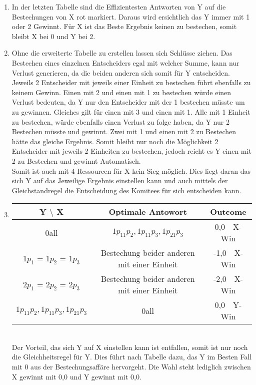 \documentclass[a4paper, 11pt]{article}
\begin{document}
\begin{enumerate}
	\item In der letzten Tabelle sind die Effizientesten Antworten von Y auf die Bestechungen von X rot markiert. Daraus wird ersichtlich das Y immer mit 1 oder 2 Gewinnt. Für X ist das Beste Ergebnis keinen zu bestechen, somit bleibt X bei 0 und Y bei 2.
	\item Ohne die erweiterte Tabelle zu erstellen lassen sich Schlüsse ziehen. Das Bestechen eines einzelnen Entscheiders egal mit welcher Summe, kann nur Verlust generieren, da die beiden anderen sich somit für Y entscheiden. Jeweils 2 Entscheider mit jeweils einer Einheit zu bestechen führt ebenfalls zu keinem Gewinn. Einen mit 2 und einen mit 1 zu bestechen würde einen Verlust bedeuten, da Y nur den Entscheider mit der 1 bestechen müsste um zu gewinnen. Gleiches gilt für einen mit 3 und einen mit 1. Alle mit 1 Einheit zu bestechen, würde ebenfalls einen Verlust zu folge haben, da Y nur 2 Bestechen müsste und gewinnt. Zwei mit 1 und einen mit 2 zu Bestechen hätte das gleiche Ergebnis. Somit bleibt nur noch die Möglichkeit 2 Entscheider mit jeweils 2 Einheiten zu bestechen, jedoch reicht es Y einen mit 2 zu Bestechen und gewinnt Automatisch. \\
	Somit ist auch mit 4 Ressourcen für X kein Sieg möglich. Dies liegt daran das sich Y auf das Jeweilige Ergebnis einstellen kann und auch mittels der Gleichstandregel die Entscheidung des Komitees für sich entscheiden kann.
	\item 
	\begin{tabular}{c | c | c}
		Y $\setminus$ X & Optimale Antowort & Outcome\\ \hline
		0all & $1p_11p_2,1p_11p_3,1p_21p_3$ & 0,0~~X-Win\\ 
		1$p_1$ = 1$p_2$ = 1$p_3$ & Bestechung beider anderen mit einer Einheit & -1,0~~X-Win\\
		2$p_1$ = 2$p_2$ = 2$p_3$ & Bestechung beider anderen mit einer Einheit  & -2,0~~X-Win\\
		$1p_11p_2,1p_11p_3,1p_21p_3$ & 0all & 0,0~~Y-Win\\
	\end{tabular}\\
	Der Vorteil, das sich Y auf X einstellen kann ist entfallen, somit ist nur noch die Gleichheitsregel für Y. Dies führt nach Tabelle dazu, das Y im Besten Fall mit 0 aus der Bestechungsaffäre hervorgeht. Die Wahl steht lediglich zwischen X gewinnt mit 0,0 und Y gewinnt mit 0,0.
\end{enumerate}
\end{document}
